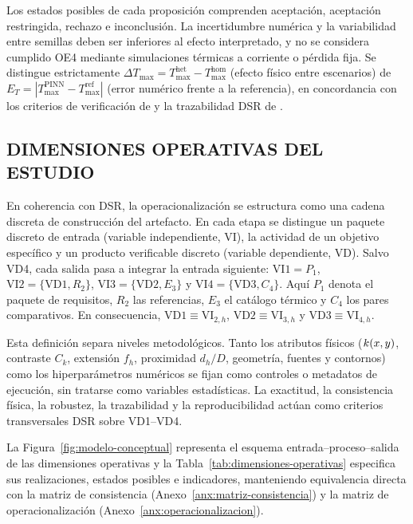 Los estados posibles de cada proposición comprenden aceptación, aceptación restringida, rechazo e inconclusión. La incertidumbre numérica y la variabilidad entre semillas deben ser inferiores al efecto interpretado, y no se considera cumplido OE4 mediante simulaciones térmicas a corriente o pérdida fija. Se distingue estrictamente $\Delta T_{\max}=T_{\max}^{\mathrm{het}}-T_{\max}^{\mathrm{hom}}$ (efecto físico entre escenarios) de $E_T=|T_{\max}^{\mathrm{PINN}}-T_{\max}^{\mathrm{ref}}|$ (error numérico frente a la referencia), en concordancia con los criterios de verificación de \textcite[93--99]{cigre2025} y la trazabilidad DSR de \textcite[350--351]{gregor2013}.

\subsection{DIMENSIONES OPERATIVAS DEL ESTUDIO}
\label{sec:dimensiones-operativas}

En coherencia con DSR, la operacionalización se estructura como una cadena discreta de construcción del artefacto. En cada etapa se distingue un paquete discreto de entrada (variable independiente, VI), la actividad de un objetivo específico y un producto verificable discreto (variable dependiente, VD). Salvo VD4, cada salida pasa a integrar la entrada siguiente: $\mathrm{VI1}=P_1$, $\mathrm{VI2}=\{\mathrm{VD1},R_2\}$, $\mathrm{VI3}=\{\mathrm{VD2},E_3\}$ y $\mathrm{VI4}=\{\mathrm{VD3},C_4\}$. Aquí $P_1$ denota el paquete de requisitos, $R_2$ las referencias, $E_3$ el catálogo térmico y $C_4$ los pares comparativos. En consecuencia, $\mathrm{VD1}\equiv\mathrm{VI}_{2,h}$, $\mathrm{VD2}\equiv\mathrm{VI}_{3,h}$ y $\mathrm{VD3}\equiv\mathrm{VI}_{4,h}$.

Esta definición separa niveles metodológicos. Tanto los atributos físicos ($k(x,y)$, contraste $C_k$, extensión $f_h$, proximidad $d_h/D$, geometría, fuentes y contornos) como los hiperparámetros numéricos se fijan como controles o metadatos de ejecución, sin tratarse como variables estadísticas. La exactitud, la consistencia física, la robustez, la trazabilidad y la reproducibilidad actúan como criterios transversales DSR sobre VD1--VD4.

La Figura~\ref{fig:modelo-conceptual} representa el esquema entrada--proceso--salida de las dimensiones operativas y la Tabla~\ref{tab:dimensiones-operativas} especifica sus realizaciones, estados posibles e indicadores, manteniendo equivalencia directa con la matriz de consistencia (Anexo~\ref{anx:matriz-consistencia}) y la matriz de operacionalización (Anexo~\ref{anx:operacionalizacion}).

